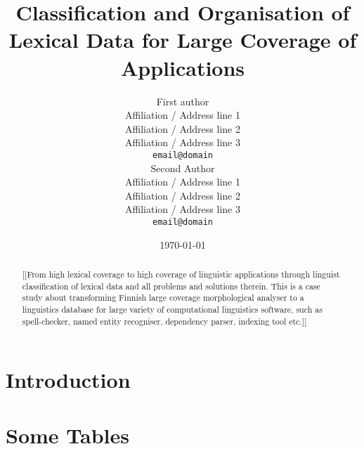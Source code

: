 \documentclass[11pt]{article}
\title{Classification and Organisation of Lexical Data for Large Coverage of Applications}
\author{First author \\
  Affiliation / Address line 1 \\
  Affiliation / Address line 2 \\
  Affiliation / Address line 3 \\
  {\tt email@domain} \\\And
  Second Author \\
  Affiliation / Address line 1 \\
  Affiliation / Address line 2 \\
  Affiliation / Address line 3 \\
  {\tt email@domain} \\}
\date{\today}
\begin{document}
\maketitle
\begin{abstract}
    [[From high lexical coverage to high coverage of linguistic applications
    through linguist classification of lexical data and all problems and
    solutions therein. This is a case study about transforming Finnish
    large coverage morphological analyser to a linguistics database for
    large variety of computational linguistics software, such as
    spell-checker, named entity recogniser, dependency parser, indexing tool
    etc.]]
\end{abstract}


\section{Introduction}
\label{sec:intro}

% 

\section{Some Tables}
\end{document}
